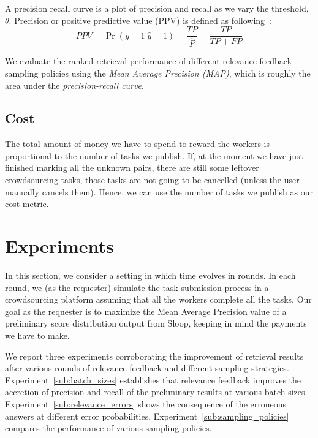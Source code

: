 A precision recall curve is a plot of precision and recall as we vary the
threshold, $\theta$. Precision or positive predictive value (PPV) is defined as
following~\cite{manning2008introduction}: 
$$PPV = \Pr{(y=1|\hat{y}=1)} =
\frac{TP}{\hat{P}} = \frac{TP}{TP+FP}$$

We evaluate the ranked retrieval performance of different relevance feedback
sampling policies using the \emph{Mean Average Precision (MAP)}, which is
roughly the area under the \emph{precision-recall curve}.

\subsection{Cost} %
\label{sub:cost}

The total amount of money we have to spend to reward the workers is proportional
to the number of tasks we publish. If, at the moment we have just finished
marking all the unknown pairs, there are still some leftover crowdsourcing
tasks, those tasks are not going to be cancelled (unless the user manually
cancels them). Hence, we can use the number of tasks we publish as our cost
metric.


\section{Experiments} %
\label{sec:experiments}

In this section, we consider a setting in which time evolves in rounds. In each
round, we (as the requester) simulate the task submission process in a
crowdsourcing platform assuming that all the workers complete all the tasks.
Our goal as the requester is to maximize the Mean Average Precision value of a
preliminary score distribution output from Sloop, keeping in mind the payments
we have to make.

We report three experiments corroborating the improvement of retrieval results
after various rounds of relevance feedback and different sampling strategies.
Experiment~\ref{sub:batch_sizes} establishes that relevance feedback improves
the accretion of precision and recall of the preliminary results at various
batch sizes.  Experiment~\ref{sub:relevance_errors} shows the consequence of the
erroneous answers at different error probabilities.
Experiment~\ref{sub:sampling_policies} compares the performance of various
sampling policies.

